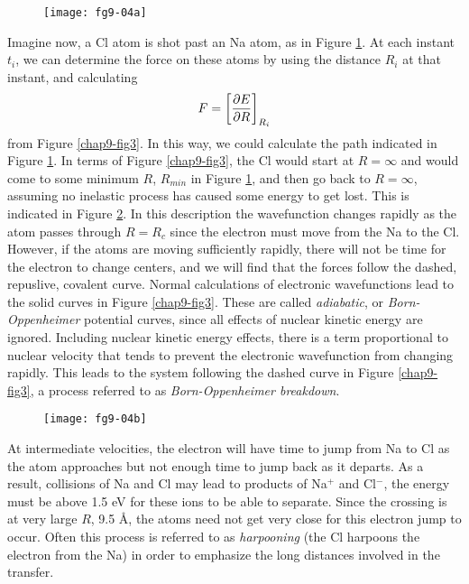 \begin{figure}
\texttt{[image: fg9-04a]}
\caption{}
\label{chap9-fig4a}
\end{figure}

Imagine now, a Cl atom is shot past an Na atom, as in Figure
\ref{chap9-fig4a}.  At each instant $t_i$, we can determine the force
on these atoms by using the distance $R_i$ at that instant, and
calculating
$$
F = \left[ {\partial E \over \partial R} \right]_{R_i}
$$
from Figure \ref{chap9-fig3}.  In this way, we could calculate the
path indicated in Figure \ref{chap9-fig4a}.  In terms of Figure
\ref{chap9-fig3}, the Cl would start at $R = \infty$ and would come to
some minimum $R$, $R_{min}$ in Figure \ref{chap9-fig4a}, and then go
back to $R =
\infty$, assuming no inelastic process has caused some energy to get
lost. This is indicated in Figure \ref{chap9-fig4b}. In this
description the wavefunction changes rapidly as the atom passes
through $R = R_c$ since the electron must move from the Na to the Cl.
However, if the atoms are moving sufficiently rapidly, there will not
be time for the electron to change centers, and we will find that the
forces follow the dashed, repuslive, covalent curve.  Normal
calculations of electronic wavefunctions lead to the solid curves in
Figure \ref{chap9-fig3}.  These are called \emph{adiabatic}, or
\emph{Born-Oppenheimer} potential curves, since all effects of nuclear
kinetic energy are ignored.  Including nuclear kinetic energy effects,
there is a term proportional to nuclear velocity that tends to prevent
the electronic wavefunction from changing rapidly.  This leads to the
system following the dashed curve in Figure \ref{chap9-fig3}, a
process referred to as \emph{Born-Oppenheimer breakdown}.


\begin{figure}
\texttt{[image: fg9-04b]}
\caption{}
\label{chap9-fig4b}
\end{figure}

At intermediate velocities, the electron will have time to jump from
Na to Cl as the atom approaches but not enough time to jump back as it
departs. As a result, collisions of Na and Cl may lead to products of
Na$^+$ and Cl$^-$, the energy must be above 1.5 eV for these ions to
be able to separate.  Since the crossing is at very large $R$, 9.5
\AA, the atoms need not get very close for this electron jump to
occur.  Often this process is referred to as \emph{harpooning} (the Cl
harpoons the electron from the Na) in order to emphasize the long
distances involved in the transfer.

